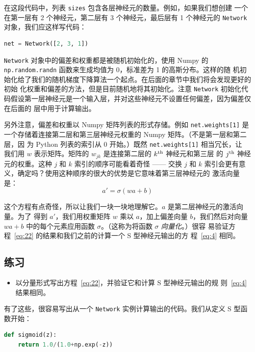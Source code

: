 在这段代码中，列表 \lstinline!sizes! 包含各层神经元的数量。例如，如果我们想创建
一个在第一层有 2 个神经元，第二层有 3 个神经元，最后层有 1 个神经元的
\lstinline!Network! 对象，我们应这样写代码：
\begin{lstlisting}[language=Python]
net = Network([2, 3, 1])
\end{lstlisting}

\lstinline!Network! 对象中的偏差和权重都是被随机初始化的，使用 Numpy 的
\lstinline!np.random.randn! 函数来生成均值为 0，标准差为 1 的高斯分布。这样的随
机初始化给了我们的随机梯度下降算法一个起点。在后面的章节中我们将会发现更好的初始
化权重和偏差的方法，但是目前随机地将其初始化。注意 \lstinline!Network! 初始化代
码假设第一层神经元是一个输入层，并对这些神经元不设置任何偏差，因为偏差仅在后面的
层中用于计算输出。

另外注意，偏差和权重以 Numpy 矩阵列表的形式存储。例如 \lstinline!net.weights[1]!
是一个存储着连接第二层和第三层神经元权重的 Numpy 矩阵。（不是第一层和第二层，因
  为 Python 列表的索引从 0 开始。）既然 \lstinline!net.weights[1]! 相当冗长，让
我们用 $w$ 表示矩阵。矩阵的 $w_{jk}$ 是连接第二层的 $k^{\rm th}$ 神经元和第三层
的 $j^{\rm th}$ 神经元的权重。这种 $j$ 和 $k$ 索引的顺序可能看着奇怪 —— 交换 $j$
和 $k$ 索引会更有意义，确定吗？使用这种顺序的很大的优势是它意味着第三层神经元的
激活向量是：
\begin{equation}
  a' = \sigma(w a + b)
  \label{eq:22}\tag{22}
\end{equation}

这个方程有点奇怪，所以让我们一块一块地理解它。$a$ 是第二层神经元的激活向量。为了
得到 $a'$，我们用权重矩阵 $w$ 乘以 $a$，加上偏差向量 $b$，我们然后对向量 $w a
+b$ 中的每个元素应用函数 $\sigma$。（这称为将函数 $\sigma$ \emph{向量化}。）很容
易验证方程~\eqref{eq:22} 的结果和我们之前的计算一个 S 型神经元输出的方
程~\eqref{eq:4} 相同。

\subsection*{练习}

\begin{itemize}
\item 以分量形式写出方程~\eqref{eq:22}，并验证它和计算 S 型神经元输出的规
  则~\eqref{eq:4} 结果相同。
\end{itemize}

有了这些，很容易写出从一个 \lstinline!Network! 实例计算输出的代码。我们从定义 S
型函数开始：
\begin{lstlisting}[language=Python]
def sigmoid(z):
    return 1.0/(1.0+np.exp(-z))
\end{lstlisting}

